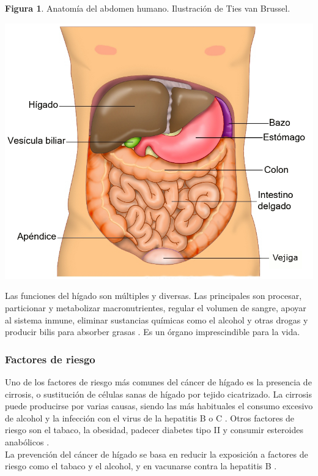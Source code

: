 \newpage
\textbf{Figura 1}. Anatomía del abdomen humano. Ilustración de Ties van Brussel.
\begin{center}
\includegraphics[width=.70\textwidth]{figuras/01_anatomia_higado.png} \\
\end{center}

Las funciones del hígado son múltiples y diversas. Las principales son procesar, particionar y metabolizar macronutrientes, regular el volumen de sangre, apoyar al sistema inmune, eliminar sustancias químicas como el alcohol y otras drogas y producir bilis para absorber grasas \cite{Trefts2017}. Es un órgano imprescindible para la vida.

\subsubsection{Factores de riesgo}

Uno de los factores de riesgo más comunes del cáncer de hígado es la presencia de cirrosis, o sustitución de células sanas de hígado por tejido cicatrizado. La cirrosis puede producirse por varias causas, siendo las más habituales el consumo excesivo de alcohol y la infección con el virus de la hepatitis B o C \cite{AmericanCancerSociety2019}. Otros factores de riesgo son el tabaco, la obesidad, padecer diabetes tipo II y consumir esteroides anabólicos \cite{AmericanCancerSociety2019, Marrero2005}.\\

La prevención del cáncer de hígado se basa en reducir la exposición a factores de riesgo como el tabaco y el alcohol, y en vacunarse contra la hepatitis B \cite{AmericanCancerSociety2019}.


